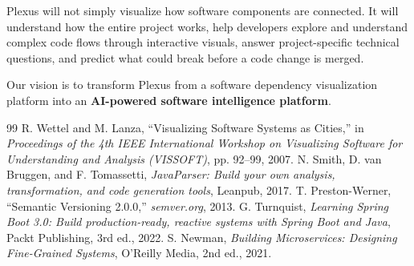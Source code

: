 \documentclass[11pt,a4paper,openany]{report}
\begin{document}
\begin{tcolorbox}[colback=lightbg,colframe=accent,arc=2mm,title={\bfseries Key Differentiator: From Visualization to Software Intelligence}]
Plexus will not simply visualize how software components are connected. It will understand how the entire project works, help developers explore and understand complex code flows through interactive visuals, answer project-specific technical questions, and predict what could break before a code change is merged.

Our vision is to transform Plexus from a software dependency visualization platform into an \textbf{AI-powered software intelligence platform}.
\end{tcolorbox}

\begin{thebibliography}{99}
 R. Wettel and M. Lanza, ``Visualizing Software Systems as Cities,'' in \textit{Proceedings of the 4th IEEE International Workshop on Visualizing Software for Understanding and Analysis (VISSOFT)}, pp. 92--99, 2007.
 N. Smith, D. van Bruggen, and F. Tomassetti, \textit{JavaParser: Build your own analysis, transformation, and code generation tools}, Leanpub, 2017.
 T. Preston-Werner, ``Semantic Versioning 2.0.0,'' \textit{semver.org}, 2013.
 G. Turnquist, \textit{Learning Spring Boot 3.0: Build production-ready, reactive systems with Spring Boot and Java}, Packt Publishing, 3rd ed., 2022.
 S. Newman, \textit{Building Microservices: Designing Fine-Grained Systems}, O'Reilly Media, 2nd ed., 2021.
\end{thebibliography}
\end{document}
